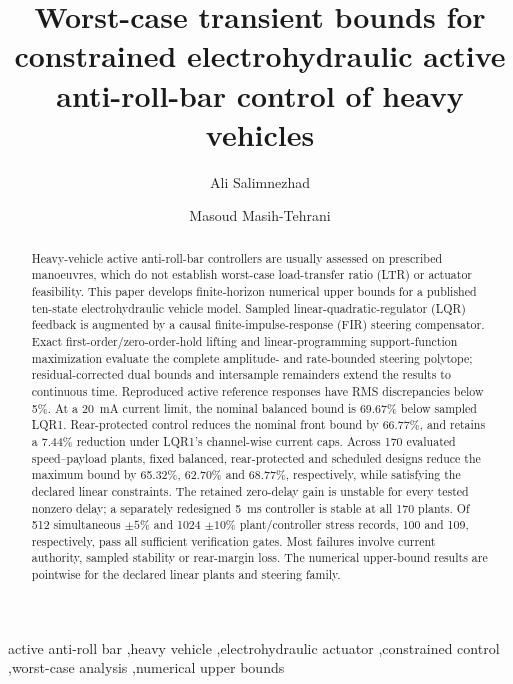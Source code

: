 \documentclass[fleqn,final,5p,times]{elsarticle}
\begin{document}
\begin{frontmatter}

\title{Worst-case transient bounds for constrained electrohydraulic active anti-roll-bar control of heavy vehicles}

\author[aff1]{Ali Salimnezhad}
\author[aff1]{Masoud Masih-Tehrani}

\begin{abstract}
Heavy-vehicle active anti-roll-bar controllers are usually assessed on prescribed manoeuvres, which do not establish worst-case load-transfer ratio (LTR) or actuator feasibility. This paper develops finite-horizon numerical upper bounds for a published ten-state electrohydraulic vehicle model. Sampled linear-quadratic-regulator (LQR) feedback is augmented by a causal finite-impulse-response (FIR) steering compensator. Exact first-order/zero-order-hold lifting and linear-programming support-function maximization evaluate the complete amplitude- and rate-bounded steering polytope; residual-corrected dual bounds and intersample remainders extend the results to continuous time. Reproduced active reference responses have RMS discrepancies below 5\%. At a \SI{20}{mA} current limit, the nominal balanced bound is 69.67\% below sampled LQR1. Rear-protected control reduces the nominal front bound by 66.77\%, and retains a 7.44\% reduction under LQR1's channel-wise current caps. Across 170 evaluated speed--payload plants, fixed balanced, rear-protected and scheduled designs reduce the maximum bound by 65.32\%, 62.70\% and 68.77\%, respectively, while satisfying the declared linear constraints. The retained zero-delay gain is unstable for every tested nonzero delay; a separately redesigned \SI{5}{ms} controller is stable at all 170 plants. Of 512 simultaneous $\pm5\%$ and 1024 $\pm10\%$ plant/controller stress records, 100 and 109, respectively, pass all sufficient verification gates. Most failures involve current authority, sampled stability or rear-margin loss. The numerical upper-bound results are pointwise for the declared linear plants and steering family.
\end{abstract}

\begin{keyword}
active anti-roll bar \sep heavy vehicle \sep electrohydraulic actuator \sep constrained control \sep worst-case analysis \sep numerical upper bounds
\end{keyword}

\end{frontmatter}
\linenumbers
\end{document}
